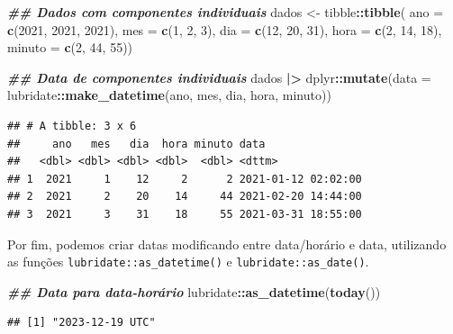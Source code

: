 \documentclass[
]{article}
\newenvironment{Shaded}{\begin{snugshade}}{\end{snugshade}}
\newcommand{\AttributeTok}[1]{\textcolor[rgb]{0.13,0.29,0.53}{#1}}
\newcommand{\DecValTok}[1]{\textcolor[rgb]{0.00,0.00,0.81}{#1}}
\newcommand{\DocumentationTok}[1]{\textcolor[rgb]{0.56,0.35,0.01}{\textbf{\textit{#1}}}}
\newcommand{\FunctionTok}[1]{\textcolor[rgb]{0.13,0.29,0.53}{\textbf{#1}}}
\newcommand{\NormalTok}[1]{#1}
\newcommand{\OtherTok}[1]{\textcolor[rgb]{0.56,0.35,0.01}{#1}}
\newcommand{\SpecialCharTok}[1]{\textcolor[rgb]{0.81,0.36,0.00}{\textbf{#1}}}
\begin{document}
\begin{Shaded}
\begin{Highlighting}[]
\DocumentationTok{\#\# Dados com componentes individuais}
\NormalTok{dados }\OtherTok{\textless{}{-}}\NormalTok{ tibble}\SpecialCharTok{::}\FunctionTok{tibble}\NormalTok{(}
    \AttributeTok{ano =} \FunctionTok{c}\NormalTok{(}\DecValTok{2021}\NormalTok{, }\DecValTok{2021}\NormalTok{, }\DecValTok{2021}\NormalTok{),}
    \AttributeTok{mes =} \FunctionTok{c}\NormalTok{(}\DecValTok{1}\NormalTok{, }\DecValTok{2}\NormalTok{, }\DecValTok{3}\NormalTok{),}
    \AttributeTok{dia =} \FunctionTok{c}\NormalTok{(}\DecValTok{12}\NormalTok{, }\DecValTok{20}\NormalTok{, }\DecValTok{31}\NormalTok{),}
    \AttributeTok{hora =} \FunctionTok{c}\NormalTok{(}\DecValTok{2}\NormalTok{, }\DecValTok{14}\NormalTok{, }\DecValTok{18}\NormalTok{), }
    \AttributeTok{minuto =} \FunctionTok{c}\NormalTok{(}\DecValTok{2}\NormalTok{, }\DecValTok{44}\NormalTok{, }\DecValTok{55}\NormalTok{))}

\DocumentationTok{\#\# Data de componentes individuais}
\NormalTok{dados }\SpecialCharTok{|\textgreater{}} 
\NormalTok{    dplyr}\SpecialCharTok{::}\FunctionTok{mutate}\NormalTok{(}\AttributeTok{data =}\NormalTok{ lubridate}\SpecialCharTok{::}\FunctionTok{make\_datetime}\NormalTok{(ano, mes, dia, hora, minuto))}
\end{Highlighting}
\end{Shaded}

\begin{verbatim}
## # A tibble: 3 x 6
##     ano   mes   dia  hora minuto data               
##   <dbl> <dbl> <dbl> <dbl>  <dbl> <dttm>             
## 1  2021     1    12     2      2 2021-01-12 02:02:00
## 2  2021     2    20    14     44 2021-02-20 14:44:00
## 3  2021     3    31    18     55 2021-03-31 18:55:00
\end{verbatim}

Por fim, podemos criar datas modificando entre data/horário e data, utilizando as funções \texttt{lubridate::as\_datetime()} e \texttt{lubridate::as\_date()}.

\begin{Shaded}
\begin{Highlighting}[]
\DocumentationTok{\#\# Data para data{-}horário}
\NormalTok{lubridate}\SpecialCharTok{::}\FunctionTok{as\_datetime}\NormalTok{(}\FunctionTok{today}\NormalTok{())}
\end{Highlighting}
\end{Shaded}

\begin{verbatim}
## [1] "2023-12-19 UTC"
\end{verbatim}
\end{document}
